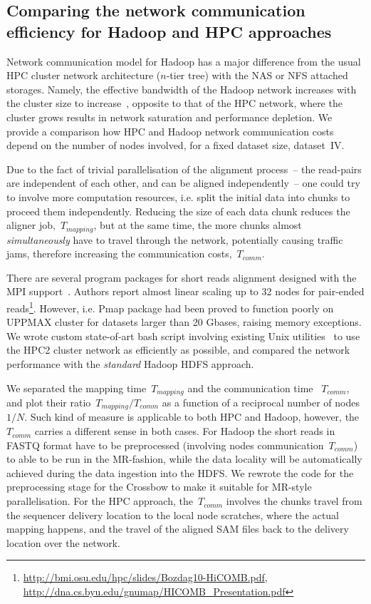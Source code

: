 \documentclass[11pt, oneside]{article}   	%
\begin{document}
 \subsection{Comparing the network communication efficiency for Hadoop and HPC approaches }
Network communication model for Hadoop has a major difference from the usual HPC cluster network architecture ($n$-tier tree) with the NAS or NFS attached storages. Namely, the effective bandwidth of the Hadoop network increases with the cluster size to increase~\cite{Sammer:2012}, opposite to that of the HPC network, where the cluster grows results in network saturation and performance depletion.
We provide a comparison how HPC and Hadoop  network communication costs depend on the number of nodes involved, for a fixed dataset size, dataset~IV.
 
Due to the fact of trivial parallelisation of the alignment process~-- the read-pairs are independent of each other, and can be aligned independently~-- one could try to involve more computation resources, i.e. split the initial data into chunks to proceed them independently.
Reducing the size of each data chunk reduces the aligner  job,~$T_{mapping}$, but at the same time, the more chunks almost {\it simultaneously} have to travel through the network, potentially causing traffic jams, therefore increasing the communication costs,~$T_{comm}$.

There are several program packages for short reads alignment designed with the MPI support~\cite{pmap, gnumap}. Authors report almost linear scaling up to 32 nodes for pair-ended reads\footnote{\url{http://bmi.osu.edu/hpc/slides/Bozdag10-HiCOMB.pdf}, \url{http://dna.cs.byu.edu/gnumap/HICOMB_Presentation.pdf}}. However,  i.e. Pmap package had been proved to function poorly on UPPMAX cluster for  datasets larger than 20 Gbases, raising  memory exceptions.
We wrote custom state-of-art bash script involving existing Unix utilities~\cite{repo} to use the  HPC2 cluster network as efficiently as possible,  and compared the network performance with the {\it standard} Hadoop HDFS approach.

We separated the mapping time~$T_{mapping}$ and the  communication time~ $T_{comm}$, and plot their ratio~$T_{mapping}/T_{comm}$ as a function of a reciprocal number of nodes~$1/N$. 
Such kind of measure is applicable to both HPC and Hadoop, however, the~$T_{comm}$ carries a different sense in both cases. For Hadoop the short reads in FASTQ format have to be preprocessed (involving nodes communication~$T_{comm}$) to  able to be run in the MR-fashion, while the data locality will be automatically achieved during the data  ingestion into the HDFS. 
We rewrote the code for the preprocessing stage for the Crossbow to make it suitable for MR-style parallelisation.
For the HPC approach, the~$T_{comm}$ involves the chunks travel from the sequencer delivery location to the local node scratches, where the actual mapping happens, and the travel of the aligned SAM files back to the delivery location over the network. 
\end{document}
